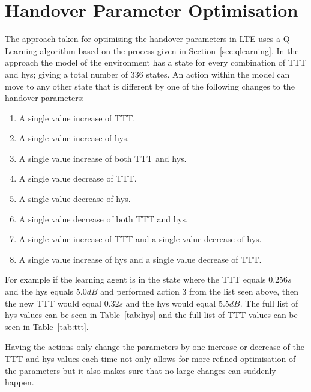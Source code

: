 \chapter{Handover Parameter Optimisation}\label{handover parameter optimisation}
The approach taken for optimising the handover parameters in LTE uses a Q-Learning algorithm based on the process given in Section~\ref{sec:qlearning}. In the approach the model of the environment has a state for every combination of TTT and hys; giving a total number of 336 states. An action within the model can move to any other state that is different by one of the following changes to the handover parameters:

\begin{enumerate}
	\item A single value increase of TTT.
	\item A single value increase of hys.
	\item A single value increase of both TTT and hys.
	\item A single value decrease of TTT.
	\item A single value decrease of hys.
	\item A single value decrease of both TTT and hys.
	\item A single value increase of TTT and a single value decrease of hys.
	\item A single value increase of hys and a single value decrease of TTT.
\end{enumerate}

For example if the learning agent is in the state where the TTT equals $0.256 s$ and the hys equals $5.0 dB$ and performed action 3 from the list seen above, then the new TTT would equal $0.32 s$ and the hys would equal $5.5 dB$. The full list of hys values can be seen in Table~\ref{tab:hys} and the full list of TTT values can be seen in Table~\ref{tab:ttt}.

Having the actions only change the parameters by one increase or decrease of the TTT and hys values each time not only allows for more refined optimisation of the parameters but it also makes sure that no large changes can suddenly happen.

